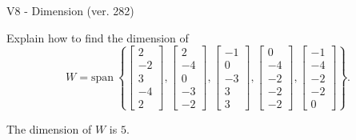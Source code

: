 \begin{exercise}
  \begin{exerciseTitle}V8 - Dimension (ver. 282)\end{exerciseTitle}
  \begin{exerciseStatement}
    Explain how to find the dimension of 
\[W=\mathrm{span}\ \left\{\left[\begin{array}{r}
2 \\
-2 \\
3 \\
-4 \\
2
\end{array}\right] , \left[\begin{array}{r}
2 \\
-4 \\
0 \\
-3 \\
-2
\end{array}\right] , \left[\begin{array}{r}
-1 \\
0 \\
-3 \\
3 \\
3
\end{array}\right] , \left[\begin{array}{r}
0 \\
-4 \\
-2 \\
-2 \\
-2
\end{array}\right] , \left[\begin{array}{r}
-1 \\
-4 \\
-2 \\
-2 \\
0
\end{array}\right]\right\}.\]



  \end{exerciseStatement}
  \begin{exerciseAnswer}
   The dimension of \(W\) is  \(5\).
  


  \end{exerciseAnswer}
\end{exercise}